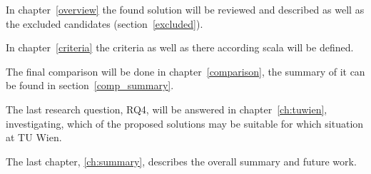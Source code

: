 In chapter~\ref{overview} the found solution will be reviewed and described as well as the excluded candidates (section~\ref{excluded}).

In chapter~\ref{criteria} the criteria as well as there according scala will be defined.

The final comparison will be done in chapter~\ref{comparison}, the summary of it can be found in section~\ref{comp_summary}.

The last research question, RQ4, will be answered in chapter~\ref{ch:tuwien}, investigating, which of the proposed solutions may be suitable for which situation at TU Wien.

The last chapter, \ref{ch:summary}, describes the overall summary and future work.